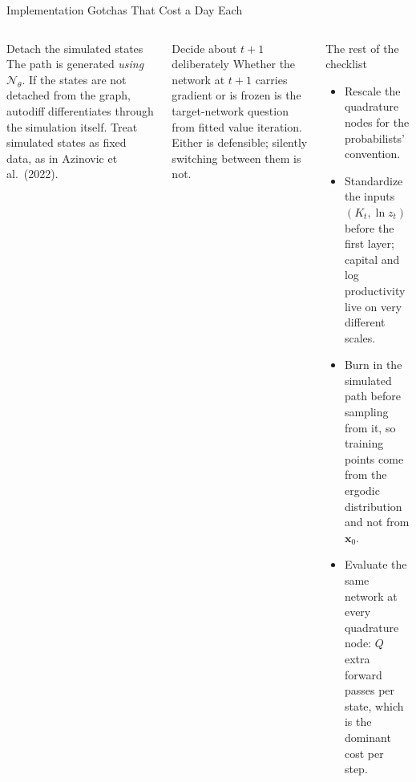 \documentclass[aspectratio=169,11pt]{beamer}
\newcommand{\emphc}[1]{\textcolor{harvardcrimson}{#1}}
\newcommand{\x}{\bm{x}}
\newcommand{\param}{\theta}          %
\newcommand{\state}{\bm{x}}          %
\newcommand{\net}{\mathcal{N}_{\param}} %
\begin{document}
\begin{frame}{Implementation Gotchas That Cost a Day Each}
\begin{columns}[T]
\begin{alertblock}{Detach the simulated states}
\footnotesize
The path is generated \emph{using} $\net$. If the states are not detached from the graph, autodiff differentiates through the simulation itself. Treat simulated states as fixed data, as in Azinovic et al.\ (2022).
\end{alertblock}

\begin{alertblock}{Decide about $t{+}1$ deliberately}
\footnotesize
Whether the network at $t{+}1$ carries gradient or is frozen is the target-network question from fitted value iteration. Either is defensible; silently switching between them is not.
\end{alertblock}

\begin{block}{The rest of the checklist}
\footnotesize
\begin{itemize}\itemsep2pt
    \item \emphc{Rescale the quadrature nodes} for the probabilists' convention.
    \item \emphc{Standardize the inputs} $(K_t, \ln z_t)$ before the first layer; capital and log productivity live on very different scales.
    \item \emphc{Burn in} the simulated path before sampling from it, so training points come from the ergodic distribution and not from $\state_0$.
    \item \emphc{Evaluate the same network at every quadrature node}: $Q$ extra forward passes per state, which is the dominant cost per step.
\end{itemize}
\end{block}
\end{columns}
\end{frame}
\end{document}
